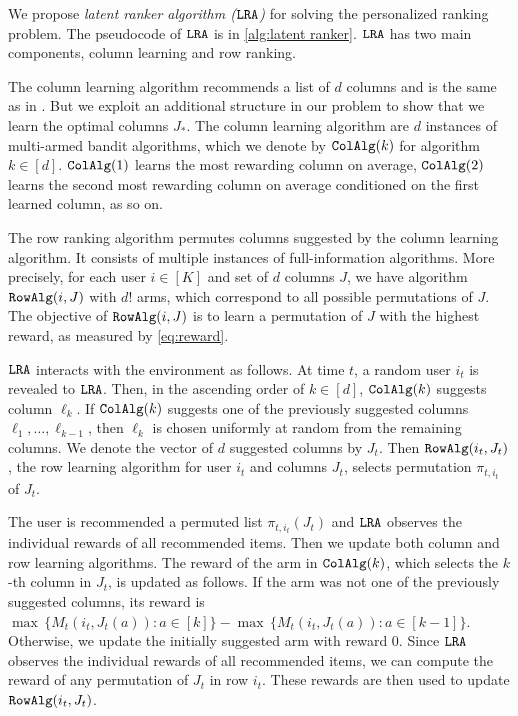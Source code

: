 

We propose \emph{latent ranker algorithm (${\tt LRA}$)} for solving the personalized ranking problem. The pseudocode of ${\tt LRA}$ is in \cref{alg:latent ranker}. ${\tt LRA}$ has two main components, column learning and row ranking.

The column learning algorithm recommends a list of $d$ columns and is the same as in \citet{radlinski2008learning}. But we exploit an additional structure in our problem to show that we learn the optimal columns $J_\ast$. The column learning algorithm are $d$ instances of multi-armed bandit algorithms, which we denote by ${\tt ColAlg}(k)$ for algorithm $k \in [d]$. ${\tt ColAlg}(1)$ learns the most rewarding column on average, ${\tt ColAlg}(2)$ learns the second most rewarding column on average conditioned on the first learned column, as so on.

The row ranking algorithm permutes columns suggested by the column learning algorithm. It consists of multiple instances of full-information algorithms. More precisely, for each user $i \in [K]$ and set of $d$ columns $J$, we have algorithm ${\tt RowAlg}(i, J)$ with $d!$ arms, which correspond to all possible permutations of $J$. The objective of ${\tt RowAlg}(i, J)$ is to learn a permutation of $J$ with the highest reward, as measured by \eqref{eq:reward}.

${\tt LRA}$ interacts with the environment as follows. At time $t$, a random user $i_t$ is revealed to ${\tt LRA}$. Then, in the ascending order of $k \in [d]$, ${\tt ColAlg}(k)$ suggests column $\ell_k$. If ${\tt ColAlg}(k)$ suggests one of the previously suggested columns $\ell_1, \dots, \ell_{k - 1}$, then $\ell_k$ is chosen uniformly at random from the remaining columns. We denote the vector of $d$ suggested columns  by $J_t$. Then ${\tt RowAlg}(i_t, J_t)$, the row learning algorithm for user $i_t$ and columns $J_t$, selects permutation $\pi_{t, i_t}$ of $J_t$.

The user is recommended a permuted list $\pi_{t, i_t}(J_t)$ and ${\tt LRA}$ observes the individual rewards of all recommended items. Then we update both column and row learning algorithms. The reward of the arm in ${\tt ColAlg}(k)$, which selects the $k$-th column in $J_t$, is updated as follows. If the arm was not one of the previously suggested columns, its reward is $\max \, \{M_t(i_t, J_t(a)): a \in [k]\} - \max \, \{M_t(i_t, J_t(a)): a \in [k - 1]\}$. Otherwise, we update the initially suggested arm with reward $0$. Since ${\tt LRA}$ observes the individual rewards of all recommended items, we can compute the reward of any permutation of $J_t$ in row $i_t$. These rewards are then used to update ${\tt RowAlg}(i_t, J_t)$. 

